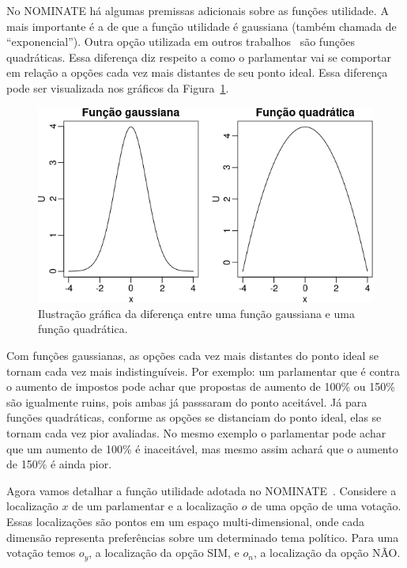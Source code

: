 \documentclass[
	article,			%
	12pt,				%
	oneside,			%
	a4paper,			%
	english,			%
	brazil,				%
	sumario=tradicional,
	oldfontcommands %
	]{abntex2}
\newcommand\nay{NÃO\xspace}
\newcommand\yea{SIM\xspace}
\newcommand\nominate{NOMINATE\xspace}
\begin{document}
No \nominate há algumas premissas adicionais sobre as funções utilidade. A mais importante é a de que a função utilidade é gaussiana (também chamada de ``exponencial''). Outra opção utilizada em outros trabalhos~\cite{clinton2004ideal} são funções quadráticas. Essa diferença diz respeito a como o parlamentar vai se comportar em relação a opções cada vez mais distantes de seu ponto ideal. Essa diferença pode ser visualizada nos gráficos da Figura~\ref{fig:gaussiana_quadratica}. 

\begin{figure}[h!]
  \centering
  \includegraphics[scale=0.6]{figs/gaussiana_quadratica.png}
  \caption{Ilustração gráfica da diferença entre uma função gaussiana e uma função quadrática.}
  \label{fig:gaussiana_quadratica}
\end{figure}

Com funções gaussianas, as opções cada vez mais distantes do ponto ideal se tornam cada vez mais indistinguíveis. Por exemplo: um parlamentar que é contra o aumento de impostos pode achar que propostas de aumento de 100\% ou 150\% são igualmente ruins, pois ambas já passsaram do ponto aceitável. Já para funções quadráticas, conforme as opções se distanciam do ponto ideal, elas se tornam cada vez pior avaliadas. No mesmo exemplo o parlamentar pode achar que um aumento de 100\% é inaceitável, mas mesmo assim achará que o aumento de 150\% é ainda pior.

Agora vamos detalhar a função utilidade adotada no \nominate~\cite{poole1985nominate}. Considere a localização $x$ de um parlamentar e a localização $o$ de uma opção de uma votação. Essas localizações são pontos em um espaço multi-dimensional, onde cada dimensão representa preferências sobre um determinado tema político. Para uma votação temos $o_y$, a localização da opção \yea, e $o_n$, a localização da opção \nay. 
\end{document}
